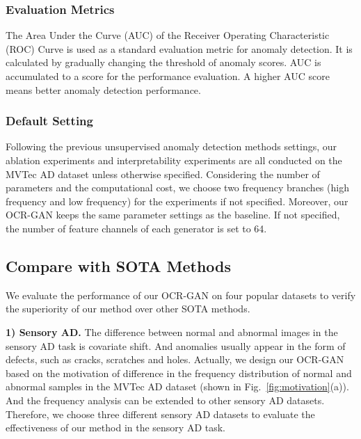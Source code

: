 \documentclass[lettersize,journal]{IEEEtran}
\begin{document}
\subsubsection{Evaluation Metrics}
The Area Under the Curve (AUC) of the Receiver Operating Characteristic (ROC) Curve is used as a standard evaluation metric for anomaly detection. It is calculated by gradually changing the threshold of anomaly scores. AUC is accumulated to a score for the performance evaluation. A higher AUC score means better anomaly detection performance.

\subsubsection{Default Setting}
Following the previous unsupervised anomaly detection methods settings, our ablation experiments and interpretability experiments are all conducted on the MVTec AD dataset unless otherwise specified. Considering the number of parameters and the computational cost, we choose two frequency branches (high frequency and low frequency) for the experiments if not specified. Moreover, our OCR-GAN keeps the same parameter settings as the baseline. If not specified, the number of feature channels of each generator is set to 64.


\subsection{Compare with SOTA Methods}
We evaluate the performance of our OCR-GAN on four popular datasets to verify the superiority of our method over other SOTA methods.

\noindent\textbf{1) Sensory AD.} The difference between normal and abnormal images in the sensory AD task is covariate shift. And anomalies usually appear in the form of defects, such as cracks, scratches and holes. Actually, we design our OCR-GAN based on the motivation of difference in the frequency distribution of normal and abnormal samples in the MVTec AD dataset (shown in Fig.~\ref{fig:motivation}(a)). And the frequency analysis can be extended to other sensory AD datasets. Therefore, we choose three different sensory AD datasets to evaluate the effectiveness of our method in the sensory AD task.
\end{document}
